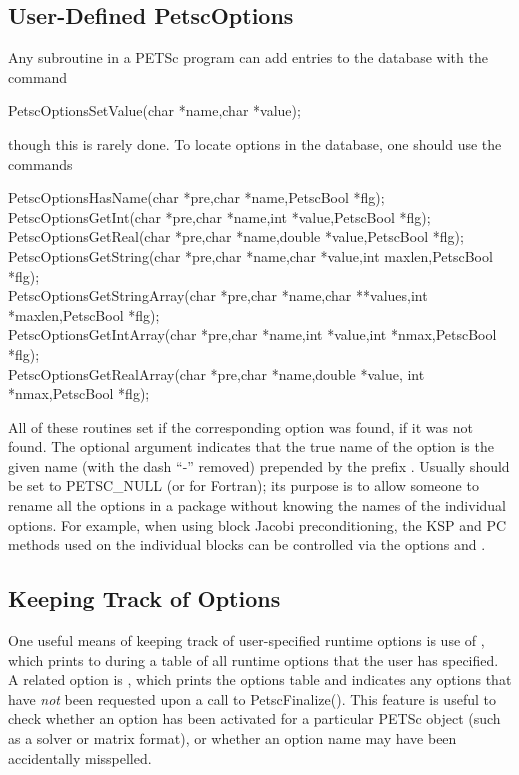 {{{\subsection{User-Defined PetscOptions}

Any subroutine in a PETSc program can add entries to the database with the 
command
\begin{tabbing}
  PetscOptionsSetValue(char *name,char *value);
\end{tabbing}
though this is rarely done.
To locate options in the database, one should use the
commands
\begin{tabbing}
  PetscOptionsHasName(char *pre,char *name,PetscBool  *flg);\\
  PetscOptionsGetInt(char *pre,char *name,int *value,PetscBool  *flg);\\
  PetscOptionsGetReal(char *pre,char *name,double *value,PetscBool  *flg);\\
  PetscOptionsGetString(char *pre,char *name,char *value,int maxlen,PetscBool  *flg);\\
  PetscOptionsGetStringArray(char *pre,char *name,char **values,int *maxlen,PetscBool  *flg);\\
  PetscOptionsGetIntArray(char *pre,char *name,int *value,int *nmax,PetscBool  *flg);\\
  PetscOptionsGetRealArray(char *pre,char *name,double *value, int *nmax,PetscBool  *flg);
\end{tabbing}
All of
these 
routines set  if the corresponding option was found,  if it
was not found.  The optional argument
 indicates that the true name of the option is the given name
(with the dash ``-'' removed) prepended by the prefix .
Usually  should be set to PETSC_NULL (or 
for Fortran); its purpose is to
allow someone to rename all the options in a package without knowing
the names of the individual options.  For example, when using block
Jacobi preconditioning, the KSP and PC methods used on the individual
blocks can be controlled via the options  and . 

\subsection{Keeping Track of Options}

One useful means of keeping track of user-specified runtime options is
use of , which prints to  during  a table of all runtime options that the user has
specified.   A related option is ,
 which prints the options table and indicates
any options that have {\em not} been requested upon a call to PetscFinalize().  This feature is useful to check whether an option
has been activated for a particular PETSc object (such as a solver or
matrix format), or whether an option name may have been accidentally
misspelled.

}}}
